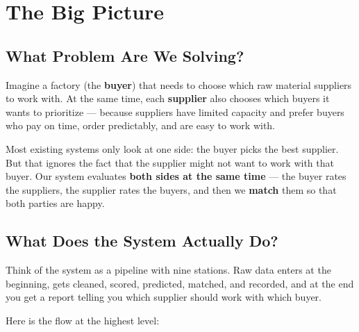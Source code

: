 \documentclass[11pt]{article}
\begin{document}
\newpage
{}
\hypersetup{pageanchor=true}
\begingroup
\setlength{\parskip}{0pt}
\tableofcontents
\endgroup
\newpage
{}

\section{The Big Picture}

\subsection{What Problem Are We Solving?}

Imagine a factory (the \textbf{buyer}) that needs to choose which raw material suppliers to work with. At the same time, each \textbf{supplier} also chooses which buyers it wants to prioritize --- because suppliers have limited capacity and prefer buyers who pay on time, order predictably, and are easy to work with.

Most existing systems only look at one side: the buyer picks the best supplier. But that ignores the fact that the supplier might not want to work with that buyer. Our system evaluates \textbf{both sides at the same time} --- the buyer rates the suppliers, the supplier rates the buyers, and then we \textbf{match} them so that both parties are happy.

\subsection{What Does the System Actually Do?}

Think of the system as a pipeline with nine stations. Raw data enters at the beginning, gets cleaned, scored, predicted, matched, and recorded, and at the end you get a report telling you which supplier should work with which buyer.

Here is the flow at the highest level:
\end{document}
